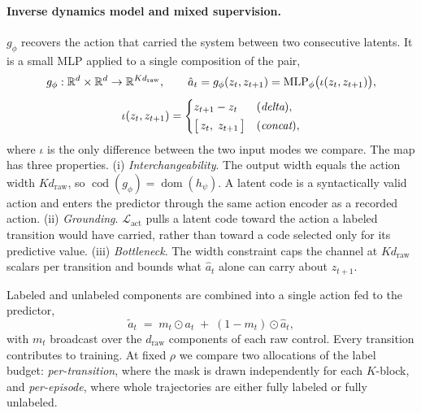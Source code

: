 \documentclass{article}
\begin{document}
\paragraph{Inverse dynamics model and mixed supervision.}
$g_\phi$ recovers the action that carried the system between two consecutive
latents. It is a small MLP applied to a single composition of the pair,
\begin{equation}
  \begin{gathered}
    g_\phi : \mathbb{R}^{d} \times \mathbb{R}^{d} \to \mathbb{R}^{K d_{\mathrm{raw}}},
    \qquad
    \hat{a}_t = g_\phi(z_t, z_{t+1}) = \operatorname{MLP}_\phi\bigl(\iota(z_t, z_{t+1})\bigr),
    \\[4pt]
    \iota(z_t, z_{t+1}) =
    \begin{cases}
      z_{t+1} - z_t & (\emph{delta}),\\[2pt]
      \bigl[\, z_t,\; z_{t+1} \,\bigr] & (\emph{concat}),
    \end{cases}
  \end{gathered}
  \label{eq:idm}
\end{equation}
where $\iota$ is the only difference between the two input modes we compare.
The map has three properties. (i) \emph{Interchangeability}. The output width
equals the action width $K d_{\mathrm{raw}}$, so
$\operatorname{cod}(g_\phi) = \operatorname{dom}(h_\psi)$. A latent code is a
syntactically valid action and enters the predictor through the same action encoder
as a recorded action.
(ii) \emph{Grounding}. $\mathcal{L}_{\mathrm{act}}$ pulls a latent code toward the
action a labeled transition would have carried, rather than toward a code
selected only for its predictive value. (iii) \emph{Bottleneck}. The width
constraint caps the channel at $K d_{\mathrm{raw}}$ scalars per transition and
bounds what $\hat{a}_t$ alone can carry about $z_{t+1}$.

Labeled and unlabeled components are combined into a single action fed to the
predictor,
\begin{equation}
  \tilde a_t \;=\; m_t \odot a_t \;+\; (1 - m_t) \odot \hat{a}_t ,
  \label{eq:mix}
\end{equation}
with $m_t$ broadcast over the $d_{\mathrm{raw}}$ components of each raw control.
Every transition contributes to training. At fixed $\rho$ we compare two
allocations of the label budget: \emph{per-transition}, where the mask is drawn
independently for each $K$-block, and \emph{per-episode}, where whole trajectories
are either fully labeled or fully unlabeled.
\end{document}

